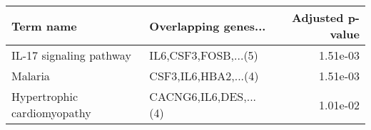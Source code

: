 \begin{tabular}{llr}
\toprule
                  Term name &  Overlapping genes... &  Adjusted p-value \\
\midrule
    IL-17 signaling pathway &  IL6,CSF3,FOSB,...(5) &          1.51e-03 \\
                    Malaria &  CSF3,IL6,HBA2,...(4) &          1.51e-03 \\
Hypertrophic cardiomyopathy & CACNG6,IL6,DES,...(4) &          1.01e-02 \\
\bottomrule
\end{tabular}
